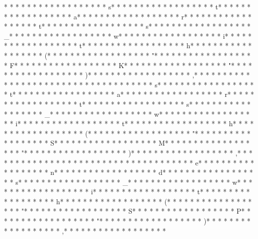 * * *  * * *  * * *  *  * * *  *  * * *  * s* * *  * * *  * * *  *  * * *  *  * * *  * t* * *  * * *  * * *  *  * * *  *  * * *  * a* * *  * * *  * * *  *  * * *  *  * * *  * r* * *  * * *  * * *  *  * * *  *  * * *  * t* * *  * * *  * * *  *  * * *  *  * * *  * s* * *  * * *  * * *  *  * * *  *  * * *  * _* * *  * * *  * * *  *  * * *  *  * * *  * w* * *  * * *  * * *  *  * * *  *  * * *  * i* * *  * * *  * * *  *  * * *  *  * * *  * t* * *  * * *  * * *  *  * * *  *  * * *  * h* * *  * * *  * * *  *  * * *  *  * * *  * (* * *  * * *  * * *  *  * * *  *  * * *  * "* * *  * * *  * * *  *  * * *  *  * * *  * F* * *  * * *  * * *  *  * * *  *  * * *  * K* * *  * * *  * * *  *  * * *  *  * * *  * "* * *  * * *  * * *  *  * * *  *  * * *  * )* * *  * * *  * * *  *  * * *  *  * * *  * ,* * *  * * *  * * *  *  * * *  *  * * *  * 
* * *  * * *  * * *  *  * * *  *  * * *  * s* * *  * * *  * * *  *  * * *  *  * * *  * t* * *  * * *  * * *  *  * * *  *  * * *  * a* * *  * * *  * * *  *  * * *  *  * * *  * r* * *  * * *  * * *  *  * * *  *  * * *  * t* * *  * * *  * * *  *  * * *  *  * * *  * s* * *  * * *  * * *  *  * * *  *  * * *  * _* * *  * * *  * * *  *  * * *  *  * * *  * w* * *  * * *  * * *  *  * * *  *  * * *  * i* * *  * * *  * * *  *  * * *  *  * * *  * t* * *  * * *  * * *  *  * * *  *  * * *  * h* * *  * * *  * * *  *  * * *  *  * * *  * (* * *  * * *  * * *  *  * * *  *  * * *  * "* * *  * * *  * * *  *  * * *  *  * * *  * S* * *  * * *  * * *  *  * * *  *  * * *  * M* * *  * * *  * * *  *  * * *  *  * * *  * "* * *  * * *  * * *  *  * * *  *  * * *  * )* * *  * * *  * * *  *  * * *  *  * * *  * ,* * *  * * *  * * *  *  * * *  *  * * *  * 
* * *  * * *  * * *  *  * * *  *  * * *  * e* * *  * * *  * * *  *  * * *  *  * * *  * n* * *  * * *  * * *  *  * * *  *  * * *  * d* * *  * * *  * * *  *  * * *  *  * * *  * s* * *  * * *  * * *  *  * * *  *  * * *  * _* * *  * * *  * * *  *  * * *  *  * * *  * w* * *  * * *  * * *  *  * * *  *  * * *  * i* * *  * * *  * * *  *  * * *  *  * * *  * t* * *  * * *  * * *  *  * * *  *  * * *  * h* * *  * * *  * * *  *  * * *  *  * * *  * (* * *  * * *  * * *  *  * * *  *  * * *  * "* * *  * * *  * * *  *  * * *  *  * * *  * S* * *  * * *  * * *  *  * * *  *  * * *  * P* * *  * * *  * * *  *  * * *  *  * * *  * "* * *  * * *  * * *  *  * * *  *  * * *  * )* * *  * * *  * * *  *  * * *  *  * * *  * ,* * *  * * *  * * *  *  * * *  *  * * *  * 
